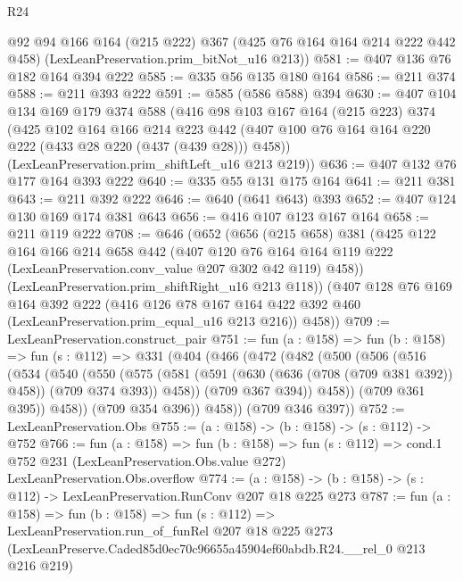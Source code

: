 \begin{lexlean}{R24}
\begin{coremodule}
      @92
      @94
      @166
      @164
      (@215 @222)
      @367
      (@425 @76 @164 @164 @214 @222 @442 @458)
      (LexLeanPreservation.prim_bitNot_u16 @213))
@581 := @407 @136 @76 @182 @164 @394 @222
@585 := @335 @56 @135 @180 @164
@586 := @211 @374
@588 := @211 @393 @222
@591 := @585 (@586 @588) @394
@630 := @407
    @104
    @134
    @169
    @179
    @374
    @588
    (@416
      @98
      @103
      @167
      @164
      (@215 @223)
      @374
      (@425
        @102
        @164
        @166
        @214
        @223
        @442
        (@407 @100 @76 @164 @164 @220 @222 (@433 @28 @220 (@437 (@439 @28))) @458))
      (LexLeanPreservation.prim_shiftLeft_u16 @213 @219))
@636 := @407 @132 @76 @177 @164 @393 @222
@640 := @335 @55 @131 @175 @164
@641 := @211 @381
@643 := @211 @392 @222
@646 := @640 (@641 @643) @393
@652 := @407 @124 @130 @169 @174 @381 @643
@656 := @416 @107 @123 @167 @164
@658 := @211 @119 @222
@708 := @646
    (@652
      (@656
        (@215 @658)
        @381
        (@425
          @122
          @164
          @166
          @214
          @658
          @442
          (@407
            @120
            @76
            @164
            @164
            @119
            @222
            (LexLeanPreservation.conv_value @207 @302 @42 @119)
            @458))
        (LexLeanPreservation.prim_shiftRight_u16 @213 @118))
      (@407
        @128
        @76
        @169
        @164
        @392
        @222
        (@416 @126 @78 @167 @164 @422 @392 @460 (LexLeanPreservation.prim_equal_u16 @213 @216))
        @458))
@709 := LexLeanPreservation.construct_pair
@751 := fun (a : @158) =>
  fun (b : @158) =>
  fun (s : @112) =>
  @331
    (@404
      (@466
        (@472
          (@482
            (@500
              (@506
                (@516
                  (@534
                    (@540
                      (@550
                        (@575
                          (@581
                            (@591 (@630 (@636 (@708 (@709 @381 @392)) @458)) (@709 @374 @393))
                            @458))
                        (@709 @367 @394))
                      @458))
                  (@709 @361 @395))
                @458))
            (@709 @354 @396))
          @458))
      (@709 @346 @397))
@752 := LexLeanPreservation.Obs
@755 := (a : @158) -> (b : @158) -> (s : @112) -> @752
@766 := fun (a : @158) =>
  fun (b : @158) =>
  fun (s : @112) =>
  cond.{1} @752 @231 (LexLeanPreservation.Obs.value @272) LexLeanPreservation.Obs.overflow
@774 := (a : @158) -> (b : @158) -> (s : @112) -> LexLeanPreservation.RunConv @207 @18 @225 @273
@787 := fun (a : @158) =>
  fun (b : @158) =>
  fun (s : @112) =>
  LexLeanPreservation.run_of_funRel
    @207
    @18
    @225
    @273
    (LexLeanPreserve.Caded85d0ec70c96655a45904ef60abdb.R24.__rel_0 @213 @216 @219)
\end{coremodule}
\end{lexlean}
